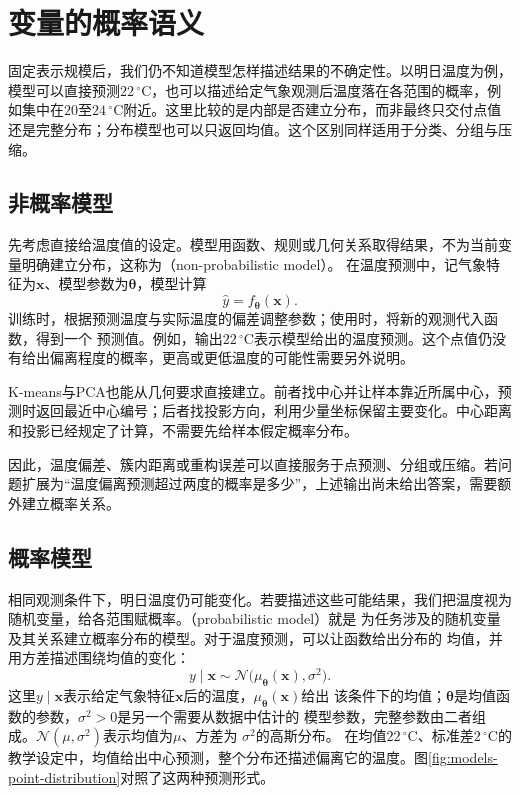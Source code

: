 \section{变量的概率语义}
\label{sec:models-probability}

固定表示规模后，我们仍不知道模型怎样描述结果的不确定性。以明日温度为例，模型可以直接预测$22\,^{\circ}\mathrm{C}$，也可以描述给定气象观测后温度落在各范围的概率，例如集中在$20$至$24\,^{\circ}\mathrm{C}$附近。这里比较的是内部是否建立分布，而非最终只交付点值还是完整分布；分布模型也可以只返回均值。这个区别同样适用于分类、分组与压缩。

\subsection{非概率模型}
\label{sec:models-nonprobabilistic}

先考虑直接给温度值的设定。模型用函数、规则或几何关系取得结果，不为当前变量明确建立分布，这称为（non-probabilistic model）。
在温度预测中，记气象特征为$\bm{x}$、模型参数为$\bm{\theta}$，模型计算
\begin{equation}
  \hat{y}=f_{\bm{\theta}}(\bm{x}).
  \label{eq:models-point-prediction}
\end{equation}
训练时，根据预测温度与实际温度的偏差调整参数；使用时，将新的观测代入函数，得到一个
预测值。例如，输出$22\,^{\circ}\mathrm{C}$表示模型给出的温度预测。这个点值仍没有给出偏离程度的概率，更高或更低温度的可能性需要另外说明。

K-means与PCA也能从几何要求直接建立。前者找中心并让样本靠近所属中心，预测时返回最近中心编号；后者找投影方向，利用少量坐标保留主要变化。中心距离和投影已经规定了计算，不需要先给样本假定概率分布。

因此，温度偏差、簇内距离或重构误差可以直接服务于点预测、分组或压缩。若问题扩展为“温度偏离预测超过两度的概率是多少”，上述输出尚未给出答案，需要额外建立概率关系。

\subsection{概率模型}
\label{sec:models-probabilistic}

相同观测条件下，明日温度仍可能变化。若要描述这些可能结果，我们把温度视为随机变量，给各范围赋概率。（probabilistic model）就是
为任务涉及的随机变量及其关系建立概率分布的模型。对于温度预测，可以让函数给出分布的
均值，并用方差描述围绕均值的变化：
\begin{equation}
  y\mid\bm{x}\sim\mathcal{N}\bigl(\mu_{\bm{\theta}}(\bm{x}),\sigma^2\bigr).
  \label{eq:models-linear-gaussian}
\end{equation}
这里$y\mid\bm{x}$表示给定气象特征$\bm{x}$后的温度，$\mu_{\bm{\theta}}(\bm{x})$给出
该条件下的均值；$\bm{\theta}$是均值函数的参数，$\sigma^2>0$是另一个需要从数据中估计的
模型参数，完整参数由二者组成。$\mathcal{N}(\mu,\sigma^2)$表示均值为$\mu$、方差为
$\sigma^2$的高斯分布。
在均值$22\,^{\circ}\mathrm{C}$、标准差$2\,^{\circ}\mathrm{C}$的教学设定中，均值给出中心预测，整个分布还描述偏离它的温度。图\ref{fig:models-point-distribution}对照了这两种预测形式。

